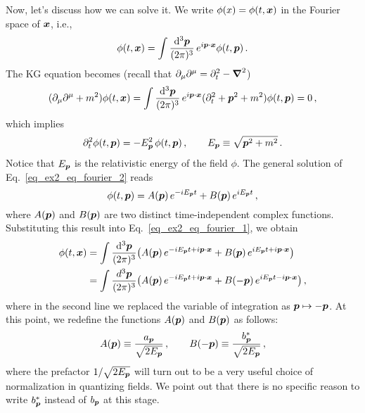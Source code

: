 \begin{sol}
	Now, let's discuss how we can solve it. 
	We write $\phi(x) = \phi(t,\boldsymbol{x})$ in the Fourier space of $\boldsymbol{x}$, i.e.,
	\begin{equation}
		\phi(t,\boldsymbol{x}) = \int \frac{{\rm d}^{3} \boldsymbol{p}}{(2\pi)^{3}} \, e^{i \boldsymbol{p} \cdot \boldsymbol{x}}\phi(t,\boldsymbol{p}) \,.
		\label{eq_ex2_eq_fourier_1}
	\end{equation}
	The KG equation becomes (recall that $\partial_\mu \partial^\mu = \partial_t^2 - \boldsymbol{\nabla}^2$)
	\begin{equation}
		(\partial_{\mu}\partial^{\mu} + m^{2} ) \phi(t,\boldsymbol{x})
		=
		\int \frac{{\rm d}^{3} \boldsymbol{p}}{(2\pi)^{3}} \, e^{i \boldsymbol{p} \cdot \boldsymbol{x}} (\partial_t^2 + \boldsymbol{p}^2 + m^2) \phi(t,\boldsymbol{p})
		=
		0 \,,
	\end{equation}
	which implies
	\begin{equation}
		\partial_t^2 \phi(t,\boldsymbol{p}) = - E_{\boldsymbol{p}}^2 \, \phi(t,\boldsymbol{p}) \,,
		\qquad
		E_{\boldsymbol{p}} \equiv \sqrt{\boldsymbol{p}^2 + m^2} \,. 
		\label{eq_ex2_eq_fourier_2}
	\end{equation}
	Notice that $E_{\boldsymbol{p}}$ is the relativistic energy of the field $\phi$. 
	The general solution of Eq.~\eqref{eq_ex2_eq_fourier_2} reads 
	\begin{equation}
		\phi(t,\boldsymbol{p}) = A(\boldsymbol{p}) \, e^{-i E_{\boldsymbol{p}} t} + B(\boldsymbol{p}) \, e^{i E_{\boldsymbol{p}} t} \,, 
		\label{eq_ex2_eq_fourier_3}
	\end{equation}
	where $A(\boldsymbol{p})$ and $B(\boldsymbol{p})$ are two distinct time-independent complex functions.
	Substituting this result into Eq.~\eqref{eq_ex2_eq_fourier_1}, we obtain
	\begin{equation}
		\begin{split}
			\phi(t,\boldsymbol{x}) & = \int \frac{{\rm d}^{3} \boldsymbol{p}}{(2\pi)^{3}} \big( A(\boldsymbol{p}) \, e^{-i E_{\boldsymbol{p}} t + i \boldsymbol{p} \cdot \boldsymbol{x}} + B(\boldsymbol{p}) \, e^{i E_{\boldsymbol{p}} t + i \boldsymbol{p} \cdot \boldsymbol{x}} \big)
			\\
			& = \int \frac{d^{3} \boldsymbol{p}}{(2\pi)^{3}} \big( A(\boldsymbol{p}) \, e^{-i E_{\boldsymbol{p}} t + i \boldsymbol{p} \cdot \boldsymbol{x}} + B(-\boldsymbol{p}) \, e^{i E_{\boldsymbol{p}} t - i \boldsymbol{p} \cdot \boldsymbol{x}} \big) \,,
		\end{split}
	\end{equation}
	where in the second line we replaced the variable of integration as $\boldsymbol{p} \mapsto - \boldsymbol{p}$. 
	At this point, we redefine the functions $A(\boldsymbol{p})$ and $B(\boldsymbol{p})$ as follows:
	\begin{equation}
		A(\boldsymbol{p}) \equiv \frac{a_{\boldsymbol{p}}}{\sqrt{2E_{\boldsymbol{p}}}} \,,
		\qquad
		B(-\boldsymbol{p}) \equiv \frac{b_{\boldsymbol{p}}^*}{\sqrt{2E_{\boldsymbol{p}}}} \,,
	\end{equation}
	where the prefactor $1/\sqrt{2E_{\boldsymbol{p}}}$ will turn out to be a very useful choice of normalization in quantizing fields.    
	We point out that there is no specific reason to write $b_{\boldsymbol{p}}^*$ instead of $b_{\boldsymbol{p}}$ at this stage. 

\end{sol}
